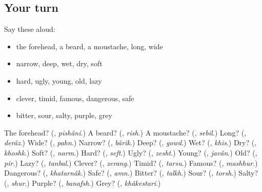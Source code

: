 \subsection*{Your turn}
Say these aloud:

\begin{itemize}
\raggedright
  \item the forehead, a beard, a moustache, long, wide
  \item narrow, deep, wet, dry, soft
  \item hard, ugly, young, old, lazy
  \item clever, timid, famous, dangerous, safe
  \item bitter, sour, salty, purple, grey
\end{itemize}

\begin{tcolorbox}[breakable,colback=teal!4,colframe=teal!35!black,title={Before you move on}]
The forehead? (\textbf{}, \emph{pishâni}.) A beard? (\textbf{}, \emph{rish}.) A moustache? (\textbf{}, \emph{sebil}.) Long? (\textbf{}, \emph{derâz}.) Wide? (\textbf{}, \emph{pahn}.) Narrow? (\textbf{}, \emph{bârik}.) Deep? (\textbf{}, \emph{gowd}.) Wet? (\textbf{}, \emph{khis}.) Dry? (\textbf{}, \emph{khoshk}.) Soft? (\textbf{}, \emph{narm}.) Hard? (\textbf{}, \emph{seft}.) Ugly? (\textbf{}, \emph{zesht}.) Young? (\textbf{}, \emph{javân}.) Old? (\textbf{}, \emph{pir}.) Lazy? (\textbf{}, \emph{tanbal}.) Clever? (\textbf{}, \emph{zerang}.) Timid? (\textbf{}, \emph{tarsu}.) Famous? (\textbf{}, \emph{mashhur}.) Dangerous? (\textbf{}, \emph{khatarnâk}.) Safe? (\textbf{}, \emph{amn}.) Bitter? (\textbf{}, \emph{talkh}.) Sour? (\textbf{}, \emph{torsh}.) Salty? (\textbf{}, \emph{shur}.) Purple? (\textbf{}, \emph{banafsh}.) Grey? (\textbf{}, \emph{khâkestari}.)
\end{tcolorbox}
